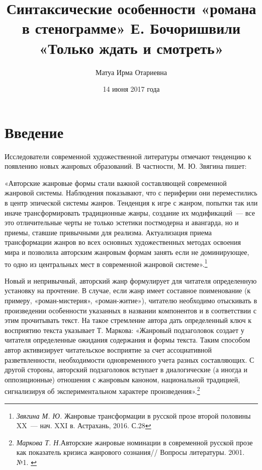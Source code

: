 \documentclass{kursa4}
\title{Синтаксические особенности «романа в стенограмме» Е. Бочоришвили «Только
ждать и смотреть»}
\author{Матуа Ирма Отариевна}
\date{14 июня 2017 года}
\begin{document}
  \thispagestyle{empty}
  \maketitle


  \setcounter{tocdepth}{2}
  \thispagestyle{empty}
  \renewcommand\contentsname{Оглавление}
  \tableofcontents

  \chapter{Введение}

  \setcounter{page}{3}
  \pagestyle{plain}

    Исследователи современной художественной литературы отмечают
    тенденцию к появлению новых жанровых образований. В частности, М. Ю.
    Звягина пишет:

    «Авторские жанровые формы стали важной составляющей современной
    жанровой системы. Наблюдения показывают, что с периферии они
    переместились в центр эпической системы жанров. Тенденция к игре с
    жанром, попытки так или иначе трансформировать традиционные жанры,
    создание их модификаций~--- все это отличительные черты не только
    эстетики постмодерна и авангарда, но и приемы, ставшие привычными для
    реализма. Актуализация приема трансформации жанров во всех основных
    художественных методах освоения мира и позволила авторским жанровым
    формам занять если не доминирующее, то одно из центральных мест в
    современной жанровой
    системе».\footnote{\textit{Звягина М. Ю.
    }{Жанровые трансформации в русской прозе второй
    половины XX~--- нач. XXI в. Астрахань, 2016. С.28}}

    Новый и непривычный, авторский жанр формулирует для читателя
    определенную установку на прочтение. В случае, если жанр имеет
    составное поименование (к примеру, «роман-мистерия», «роман-житие»),
    читателю необходимо отыскивать в произведении особенности указанных в
    названии компонентов и в соответствии с этим прочитывать текст. На
    такое стремление автора дать определенный ключ к восприятию текста
    указывает Т. Маркова:\newline
    «Жанровый подзаголовок создает у читателя определенные ожидания
    содержания и формы текста. Таким способом автор активизирует
    читательское восприятие за счет ассоциативной разветвленности,
    необходимости одновременного учета разных составляющих. С другой
    стороны, авторский подзаголовок вступает в диалогические (а иногда и
    оппозиционные) отношения с жанровым каноном, национальной традицией,
    сигнализируя об экспериментальном характере
    произведения».\footnote{{
    }\textit{{Маркова Т. Н.}}{Авторские
    жанровые номинации в современной русской прозе как показатель кризиса
    жанрового сознания// Вопросы литературы. 2001. №1. }}
\end{document}

